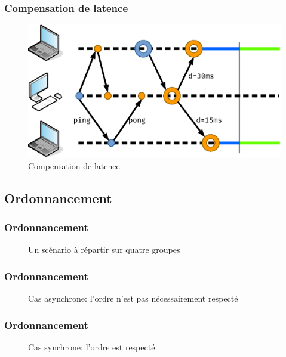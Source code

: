 \documentclass[handout]{beamer}
\begin{document}
\begin{frame}
\frametitle{Compensation de latence}
\begin{figure}
	\centering
	\includegraphics[width=\textwidth]{draw/compensated.eps}
	\caption{Compensation de latence}
\end{figure}
\end{frame}

\subsection{Ordonnancement}
\begin{frame}
\frametitle{Ordonnancement}
\centering
\Large
\begin{figure}
\begin{tikzpicture}[scale=2]

\end{tikzpicture}
\caption{Un scénario à répartir sur quatre groupes}
\end{figure}
\end{frame}

\begin{frame}
\frametitle{Ordonnancement}
\centering
\large
\begin{figure}
	\begin{tikzpicture}[scale=1.1]
	
	\end{tikzpicture}
	\caption{Cas asynchrone: l'ordre n'est pas nécessairement respecté}
\end{figure}
\end{frame}

\begin{frame}
\frametitle{Ordonnancement}
\centering
\large
\begin{figure}
\begin{tikzpicture}[scale=1.1]

\end{tikzpicture}
\caption{Cas synchrone: l'ordre est respecté}
\end{figure}
\end{frame}
\end{document}
